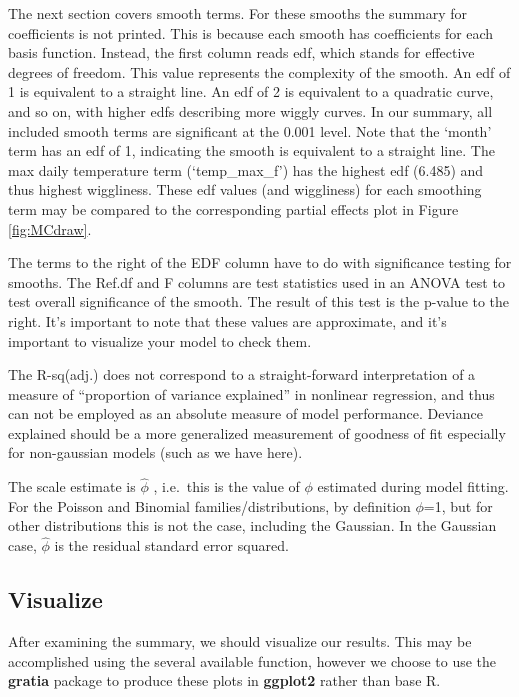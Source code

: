 \documentclass[
]{book}
\begin{document}
The next section covers smooth terms. For these smooths the summary for coefficients is not printed. This is because each smooth has coefficients for each basis function. Instead, the first column reads edf, which stands for effective degrees of freedom. This value represents the complexity of the smooth. An edf of 1 is equivalent to a straight line. An edf of 2 is equivalent to a quadratic curve, and so on, with higher edfs describing more wiggly curves. In our summary, all included smooth terms are significant at the 0.001 level. Note that the `month' term has an edf of 1, indicating the smooth is equivalent to a straight line. The max daily temperature term (`temp\_max\_f') has the highest edf (6.485) and thus highest wiggliness. These edf values (and wiggliness) for each smoothing term may be compared to the corresponding partial effects plot in Figure \ref{fig:MCdraw}.

The terms to the right of the EDF column have to do with significance testing for smooths. The Ref.df and F columns are test statistics used in an ANOVA test to test overall significance of the smooth. The result of this test is the p-value to the right. It's important to note that these values are approximate, and it's important to visualize your model to check them.

The R-sq(adj.) does not correspond to a straight-forward interpretation of a measure of ``proportion of variance explained'' in nonlinear regression, and thus can not be employed as an absolute measure of model performance. Deviance explained should be a more generalized measurement of goodness of fit especially for non-gaussian models (such as we have here).

The scale estimate is \(\hat{\phi}\) , i.e.~this is the value of \(\phi\) estimated during model fitting. For the Poisson and Binomial families/distributions, by definition \(\phi\)=1, but for other distributions this is not the case, including the Gaussian. In the Gaussian case, \(\hat{\phi}\) is the residual standard error squared.

\hypertarget{visualize}{%
\subsection{Visualize}\label{visualize}}

After examining the summary, we should visualize our results. This may be accomplished using the several available function, however we choose to use the \textbf{gratia} package \citep{R-gratia} to produce these plots in \textbf{ggplot2} rather than base R.
\end{document}
